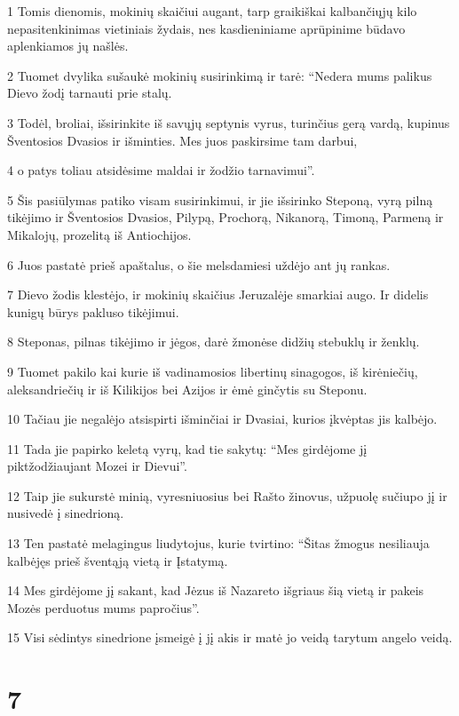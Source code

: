 \par 1 Tomis dienomis, mokinių skaičiui augant, tarp graikiškai kalbančiųjų kilo nepasitenkinimas vietiniais žydais, nes kasdieniniame aprūpinime būdavo aplenkiamos jų našlės. 
\par 2 Tuomet dvylika sušaukė mokinių susirinkimą ir tarė: “Nedera mums palikus Dievo žodį tarnauti prie stalų. 
\par 3 Todėl, broliai, išsirinkite iš savųjų septynis vyrus, turinčius gerą vardą, kupinus Šventosios Dvasios ir išminties. Mes juos paskirsime tam darbui, 
\par 4 o patys toliau atsidėsime maldai ir žodžio tarnavimui”. 
\par 5 Šis pasiūlymas patiko visam susirinkimui, ir jie išsirinko Steponą, vyrą pilną tikėjimo ir Šventosios Dvasios, Pilypą, Prochorą, Nikanorą, Timoną, Parmeną ir Mikalojų, prozelitą iš Antiochijos. 
\par 6 Juos pastatė prieš apaštalus, o šie melsdamiesi uždėjo ant jų rankas. 
\par 7 Dievo žodis klestėjo, ir mokinių skaičius Jeruzalėje smarkiai augo. Ir didelis kunigų būrys pakluso tikėjimui. 
\par 8 Steponas, pilnas tikėjimo ir jėgos, darė žmonėse didžių stebuklų ir ženklų. 
\par 9 Tuomet pakilo kai kurie iš vadinamosios libertinų sinagogos, iš kirėniečių, aleksandriečių ir iš Kilikijos bei Azijos ir ėmė ginčytis su Steponu. 
\par 10 Tačiau jie negalėjo atsispirti išminčiai ir Dvasiai, kurios įkvėptas jis kalbėjo. 
\par 11 Tada jie papirko keletą vyrų, kad tie sakytų: “Mes girdėjome jį piktžodžiaujant Mozei ir Dievui”. 
\par 12 Taip jie sukurstė minią, vyresniuosius bei Rašto žinovus, užpuolę sučiupo jį ir nusivedė į sinedrioną. 
\par 13 Ten pastatė melagingus liudytojus, kurie tvirtino: “Šitas žmogus nesiliauja kalbėjęs prieš šventąją vietą ir Įstatymą. 
\par 14 Mes girdėjome jį sakant, kad Jėzus iš Nazareto išgriaus šią vietą ir pakeis Mozės perduotus mums papročius”. 
\par 15 Visi sėdintys sinedrione įsmeigė į jį akis ir matė jo veidą tarytum angelo veidą.


\chapter{7}


